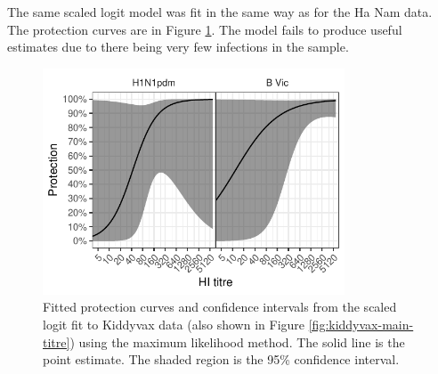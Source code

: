 The same scaled logit model was fit in the same way as for the Ha Nam data. The protection curves are in Figure \ref{fig:kiddyvaxmain-sclr-prot}. The model fails to produce useful estimates due to there being very few infections in the sample.

\begin{figure}[htp]
	\centering
	\includegraphics[width=0.8\textwidth]{../fit-sclr-plot/kiddyvaxmain-prot.pdf}
	\caption{
	Fitted protection curves and confidence intervals from the scaled logit fit to Kiddyvax data (also shown in Figure \ref{fig:kiddyvax-main-titre}) using the maximum likelihood method. The solid line is the point estimate. The shaded region is the 95\% confidence interval.
	}
	\label{fig:kiddyvaxmain-sclr-prot}
\end{figure}
